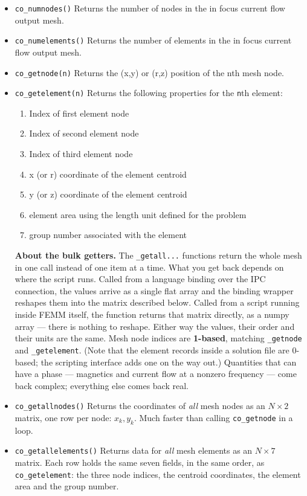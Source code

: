 \begin{itemize}
\item{\tt co\_numnodes()} Returns the number of nodes in the in focus current flow output mesh.
\item{\tt co\_numelements()} Returns the number of elements in the in focus current flow output mesh.
\item{\tt co\_getnode(n)} Returns the (x,y) or (r,z) position of the nth mesh node.
\item{\tt co\_getelement(n)} Returns the following properties for the {\tt n}th element:
    \begin{enumerate}
        \item Index of first element node
        \item Index of second element node
        \item Index of third element node
        \item x (or r) coordinate of the element centroid
        \item y (or z) coordinate of the element centroid
        \item element area using the length unit defined for the problem
        \item group number associated with the element
    \end{enumerate}
\medskip\noindent
{\bf About the bulk getters.}  The {\tt *\_getall...} functions return the whole
mesh in one call instead of one item at a time.  What you get back depends on
where the script runs.  Called from a language binding over the IPC connection,
the values arrive as a single flat array and the binding wrapper reshapes them
into the matrix described below.  Called from a script running inside FEMM
itself, the function returns that matrix directly, as a numpy array --- there is
nothing to reshape.  Either way the values, their order and their units are the
same.  Mesh node indices are {\bf 1-based}, matching {\tt *\_getnode} and
{\tt *\_getelement}.  (Note that the element records inside a solution file are
0-based; the scripting interface adds one on the way out.)  Quantities that can
have a phase --- magnetics and current flow at a nonzero frequency --- come back
complex; everything else comes back real.
\medskip

\item{\tt co\_getallnodes()} Returns the coordinates of {\em all} mesh nodes as
an $N \times 2$ matrix, one row per node: $x_k, y_k$.  Much faster than calling
{\tt co\_getnode} in a loop.

\item{\tt co\_getallelements()} Returns data for {\em all} mesh elements as an
$N \times 7$ matrix.  Each row holds the same seven fields, in the same order,
as {\tt co\_getelement}: the three node indices, the centroid coordinates, the
element area and the group number.


\end{itemize}
